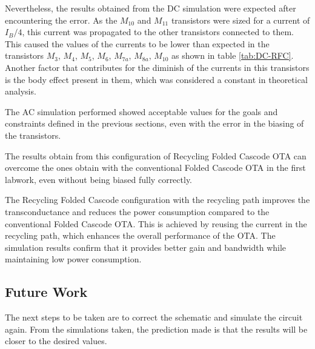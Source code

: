 Nevertheless, the results obtained from the DC simulation were expected after encountering the error. As the $M_{10}$ and $M_{11}$ transistors were sized for a current of $I_B/4$, this current was propagated to the other transistors connected to them. This caused the values of the currents to be lower than expected in the transistors $M_3$, $M_4$, $M_5$, $M_6$, $M_{7a}$, $M_{8a}$, $M_{10}$ as shown in table \ref{tab:DC-RFC}. Another factor that contributes for the diminish of the currents in this transistors is the body effect present in them, which was considered a constant in theoretical analysis.

The AC simulation performed showed acceptable values for the goals and constraints defined in the previous sections, even with the error in the biasing of the transistors.

The results obtain from this configuration of Recycling Folded Cascode OTA can overcome the ones obtain with the conventional Folded Cascode OTA in the first labwork, even without being biased fully correctly.

The Recycling Folded Cascode configuration with the recycling path improves the transconductance and reduces the power consumption compared to the conventional Folded Cascode OTA. This is achieved by reusing the current in the recycling path, which enhances the overall performance of the OTA. The simulation results confirm that it provides better gain and bandwidth while maintaining low power consumption.

\subsection{Future Work}

The next steps to be taken are to correct the schematic and simulate the circuit again. From the simulations taken, the prediction made is that the results will be closer to the desired values. 